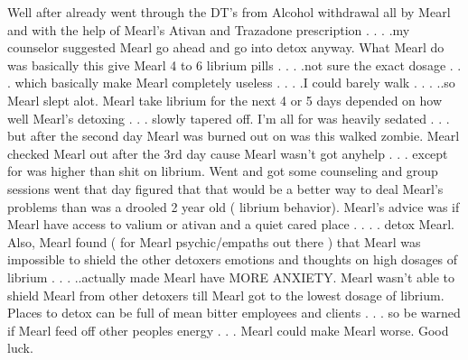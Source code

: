 \documentclass[12pt]{book}
\begin{document}
Well after already went through the DT's from Alcohol withdrawal all by Mearl and with the help of Mearl's Ativan and Trazadone prescription . . .  .my counselor suggested Mearl go ahead and go into detox anyway. What Mearl do was basically this give Mearl 4 to 6 librium pills . . .  .not sure the exact dosage . . .  which basically make Mearl completely useless . . .  .I could barely walk  . . .  ..so Mearl slept alot. Mearl take librium for the next 4 or 5 days depended on how well Mearl's detoxing . . .  slowly tapered off. I'm all for was heavily sedated . . .  but after the second day Mearl was burned out on was this walked zombie. Mearl checked Mearl out after the 3rd day cause Mearl wasn't got anyhelp  . . .  except for was higher than shit on librium. Went and got some counseling and group sessions went that day figured that that would be a better way to deal Mearl's problems than was a drooled 2 year old ( librium behavior). Mearl's advice was if Mearl have access to valium or ativan and a quiet cared place . . .  . detox Mearl. Also, Mearl found ( for Mearl psychic/empaths out there ) that Mearl was impossible to shield the other detoxers emotions and thoughts on high dosages of librium . . .  ..actually made Mearl have MORE ANXIETY. Mearl wasn't able to shield Mearl from other detoxers till Mearl got to the lowest dosage of librium. Places to detox can be full of mean bitter employees and clients . . .  so be warned if Mearl feed off other peoples energy . . .  Mearl could make Mearl worse. Good luck.
\end{document}
